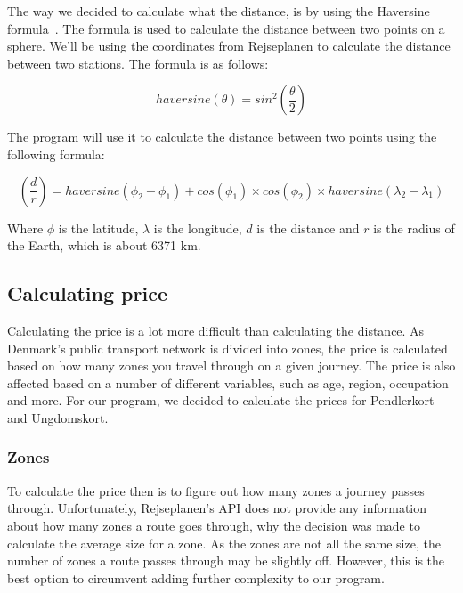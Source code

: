 The way we decided to calculate what the distance, is by using the Haversine formula~\cite{haversine}.
The formula is used to calculate the distance between two points on a sphere.
We'll be using the coordinates from Rejseplanen to calculate the distance between two stations.
The formula is as follows:

\begin{equation}
    haversine(\theta) = sin^{2}(\frac{\theta}{2})
\end{equation}

The program will use it to calculate the distance between two points using the following formula:

\begin{equation}
    (\frac{d}{r}) = haversine(\phi_{2} - \phi_{1}) + cos(\phi_{1}) \times cos(\phi_{2}) \times haversine(\lambda_{2} - \lambda_{1})
\end{equation}

Where \(\phi\) is the latitude, \(\lambda\) is the longitude, \(d\) is the distance and \(r\) is the radius of the
Earth, which is about 6371 km.

\subsection{Calculating price}\label{subsec:calculating-price}

Calculating the price is a lot more difficult than calculating the distance.
As Denmark's public transport network is divided into zones, the price is calculated based on how many zones you travel
through on a given journey.
The price is also affected based on a number of different variables, such as age, region, occupation and more.
For our program, we decided to calculate the prices for Pendlerkort and Ungdomskort.

\subsubsection{Zones}

To calculate the price then is to figure out how many zones a journey passes through.
Unfortunately, Rejseplanen's API does not provide any information about how many zones a route goes through, why the
decision was made to calculate the average size for a zone.
As the zones are not all the same size, the number of zones a route passes through may be slightly off.
However, this is the best option to circumvent adding further complexity to our program.

